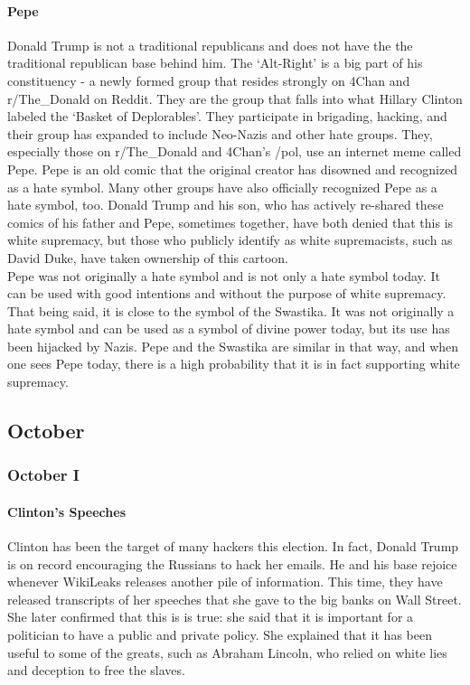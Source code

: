 \documentclass[twoside]{article}
\begin{document}
\paragraph{Pepe} Donald Trump is not a traditional republicans and does not have the the traditional republican base behind him. The ‘Alt-Right’ is a big part of his constituency - a newly formed group that resides strongly on 4Chan and r/The\_Donald on Reddit. They are the group that falls into what Hillary Clinton labeled the ‘Basket of Deplorables’. They participate in brigading, hacking, and their group has expanded to include Neo-Nazis and other hate groups. They, especially those on r/The\_Donald and 4Chan’s /pol, use an internet meme called Pepe. Pepe is an old comic that the original creator has disowned and recognized as a hate symbol. Many other groups have also officially recognized Pepe as a hate symbol, too. Donald Trump and his son, who has actively re-shared these comics of his father and Pepe, sometimes together, have both denied that this is white supremacy, but those who publicly identify as white supremacists, such as David Duke, have taken ownership of this cartoon.\\
Pepe was not originally a hate symbol and is not only a hate symbol today. It can be used with good intentions and without the purpose of white supremacy. That being said, it is close to the symbol of the Swastika. It was not originally a hate symbol and can be used as a symbol of divine power today, but its use has been hijacked by Nazis. Pepe and the Swastika are similar in that way, and when one sees Pepe today, there is a high probability that it is in fact supporting white supremacy.
\newpage
\subsection{October}
\subsubsection{October I}
\paragraph{Clinton's Speeches} Clinton has been the target of many hackers this election. In fact, Donald Trump is on record encouraging the Russians to hack her emails. He and his base rejoice whenever WikiLeaks releases another pile of information. This time, they have released transcripts of her speeches that she gave to the big banks on Wall Street. She later confirmed that this is is true: she said that it is important for a politician to have a public and private policy. She explained that it has been useful to some of the greats, such as Abraham Lincoln, who relied on white lies and deception to free the slaves.
\end{document}
